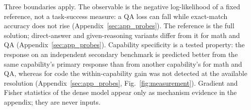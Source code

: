 Three boundaries apply. The observable is the negative log-likelihood
of a fixed reference, not a task-success measure: a QA loss can fall
while exact-match accuracy does not rise (Appendix~\ref{sec:app_probes}).
The reference is the full solution; direct-answer and
given-reasoning variants differ from it for math and QA
(Appendix~\ref{sec:app_probes}). Capability specificity is a tested
property: the response on an independent secondary benchmark is
predicted better from the same capability's primary response than from
another capability's for math and QA, whereas for code the
within-capability gain was not detected at the available resolution
(Appendix~\ref{sec:app_probes}, Fig.~\ref{fig:measurement}). Gradient
and Fisher statistics of the dense model appear only as mechanism
evidence in the appendix; they are never inputs.
